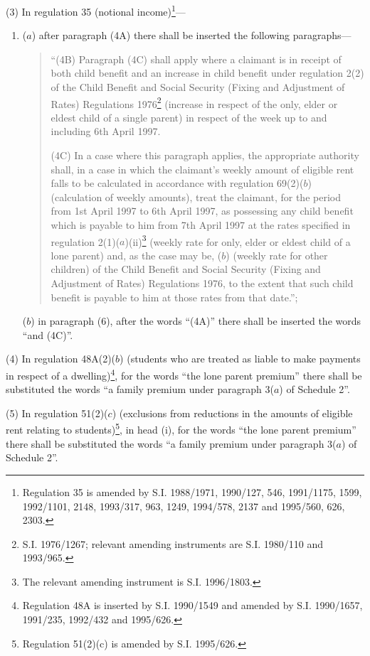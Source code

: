 \documentclass[a4paper]{article}
\begin{document}
(3) In regulation 35 (notional income)\footnote{\frenchspacing Regulation 35 is amended by S.I. 1988/1971, 1990/127, 546, 1991/1175, 1599, 1992/1101, 2148, 1993/317, 963, 1249, 1994/578, 2137 and 1995/560, 626, 2303.}---

\begin{enumerate}\item[]
($a$) after paragraph (4A) there shall be inserted the following paragraphs—
\begin{quotation}
“(4B) Paragraph (4C) shall apply where a claimant is in receipt of both child benefit and an increase in child benefit under regulation 2(2) of the Child Benefit and Social Security (Fixing and Adjustment of Rates) Regulations 1976\footnote{\frenchspacing S.I. 1976/1267; relevant amending instruments are S.I. 1980/110 and 1993/965.} (increase in respect of the only, elder or eldest child of a single parent) in respect of the week up to and including 6th April 1997.

(4C) In a case where this paragraph applies, the appropriate authority shall, in a case in which the claimant’s weekly amount of eligible rent falls to be calculated in accordance with regulation 69(2)($b$) (calculation of weekly amounts), treat the claimant, for the period from 1st April 1997 to 6th April 1997, as possessing any child benefit which is payable to him from 7th April 1997 at the rates specified in regulation 2(1)($a$)(ii)\footnote{\frenchspacing The relevant amending instrument is S.I. 1996/1803.} (weekly rate for only, elder or eldest child of a lone parent) and, as the case may be, ($b$) (weekly rate for other children) of the Child Benefit and Social Security (Fixing and Adjustment of Rates) Regulations 1976, to the extent that such child benefit is payable to him at those rates from that date.”;
\end{quotation}

($b$) in paragraph (6), after the words “(4A)” there shall be inserted the words “and (4C)”.
\end{enumerate}

(4)  In regulation 48A(2)($b$)  (students who are treated as liable to make payments in respect of a dwelling)\footnote{\frenchspacing Regulation 48A is inserted by S.I. 1990/1549 and amended by S.I. 1990/1657, 1991/235, 1992/432 and 1995/626.}, for the words “the lone parent premium” there shall be substituted the words “a family premium under paragraph 3($a$) of Schedule 2”.

(5)  In regulation 51(2)($c$) (exclusions from reductions in the amounts of eligible rent relating to students)\footnote{\frenchspacing Regulation 51(2)(c) is amended by S.I. 1995/626.}, in head (i), for the words “the lone parent premium” there shall be substituted the words “a family premium under paragraph 3($a$) of Schedule 2”.
\end{document}
